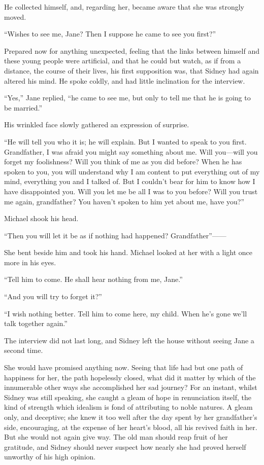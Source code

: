 He collected himself, and, regarding her, became aware that she was
strongly moved.

``Wishes to see me, Jane? Then I suppose he came to see you first?''

Prepared now for anything unexpected, feeling that the links between
himself and these young people were artificial, and that he could but
watch, as if from a distance, the course of their lives, his first
supposition was, that Sidney had again altered his mind. He spoke
coldly, and had little inclination for the interview.

``Yes,'' Jane replied, ``he came to see me, but only to tell me that he
is going to be married.''

His wrinkled face slowly gathered an expression of surprise.

``He will tell you who it is; he will explain.
{\protect\hypertarget{153}{}{}}But I wanted to speak to you first.
Grandfather, I was afraid you might say something about me. Will
you---will you forget my foolishness? Will you think of me as you did
before? When he has spoken to you, you will understand why I am content
to put everything out of my mind, everything you and I talked of. But I
couldn't bear for him to know how I have disappointed you. Will you let
me be all I was to you before? Will you trust me again, grandfather? You
haven't spoken to him yet about me, have you?''

Michael shook his head.

``Then you will let it be as if nothing had happened?
Grandfather''{{------}}

She bent beside him and took his hand. Michael looked at her with a
light once more in his eyes.

``Tell him to come. He shall hear nothing from me, Jane.''

``And you will try to forget it?''

``I wish nothing better. Tell him to come here, my child. When he's gone
we'll talk together again.''

The interview did not last long, and Sidney
{\protect\hypertarget{154}{}{}}left the house without seeing Jane a
second time.

She would have promised anything now. Seeing that life had but one path
of happiness for her, the path hopelessly closed, what did it matter by
which of the innumerable other ways she accomplished her sad journey?
For an instant, whilst Sidney was still speaking, she caught a gleam of
hope in renunciation itself, the kind of strength which idealism is fond
of attributing to noble natures. A gleam only, and deceptive; she knew
it too well after the day spent by her grandfather's side, encouraging,
at the expense of her heart's blood, all his revived faith in her. But
she would not again give way. The old man should reap fruit of her
gratitude, and Sidney should never suspect how nearly she had proved
herself unworthy of his high opinion.

